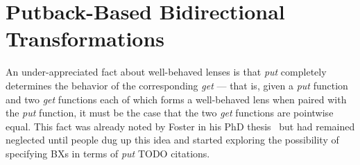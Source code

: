 \documentclass[preprint,numbers]{sigplanconf}
\newcommand{\TODO}[1]{{\color{black!10!blue}TODO #1}}
\begin{document}

\section{Putback-Based Bidirectional Transformations}

An under-appreciated fact about well-behaved lenses is that \emph{put} completely determines the behavior of the corresponding \emph{get} --- that is, given a \emph{put} function and two \emph{get} functions each of which forms a well-behaved lens when paired with the \emph{put} function, it must be the case that the two \emph{get} functions are pointwise equal. This fact was already noted by Foster in his PhD thesis~\cite{Foster2009} but had remained neglected until people dug up this idea and started exploring the possibility of specifying BXs in terms of \emph{put} \TODO{citations}.
\end{document}
